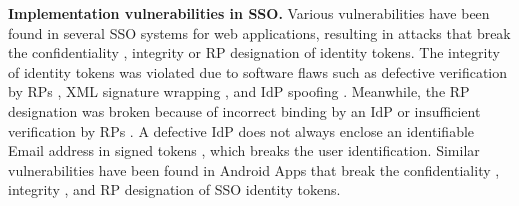 \noindent\textbf{Implementation vulnerabilities in SSO.}
Various vulnerabilities have been found in several SSO systems for web applications, resulting in attacks %
that break the confidentiality \cite{WangCW12,ccsSunB12,ArmandoCCCPS13,DiscoveringJCS,dimvaLiM16}, integrity \cite{WangCW12,SomorovskyMSKJ12,WangZLG16,MainkaMS16, MainkaMSW17,dimvaLiM16} or RP designation \cite{WangZLG16,MainkaMS16,MainkaMSW17,YangLCZ18,dimvaLiM16} of identity tokens.
The integrity of identity tokens was violated %
due to software flaws such as defective verification by RPs \cite{WangCW12,WangZLG16,MainkaMSW17}, XML signature wrapping \cite{SomorovskyMSKJ12}, and IdP spoofing \cite{MainkaMS16,MainkaMSW17}.
Meanwhile, the RP designation was broken because of incorrect binding by an IdP \cite{YangLCZ18,WangZLG16} or insufficient verification by RPs \cite{MainkaMS16,MainkaMSW17,YangLCZ18}.
A defective IdP does not always enclose an identifiable Email address in signed tokens \cite{WangCW12},
 which breaks the user identification.
Similar vulnerabilities have been found in Android Apps that break the confidentiality \cite{ChenPCTKT14,WangZLLYLG15,YangLS17,ShiWL19}, integrity \cite{ChenPCTKT14,YangLS17}, and RP designation \cite{ChenPCTKT14,ShiWL19,WangZLLYLG15} of SSO identity tokens.








